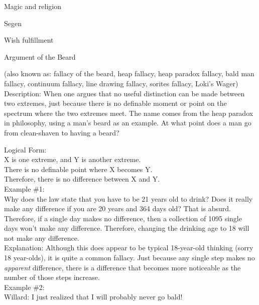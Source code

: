 \documentclass[a4paper,12pt,single,pdftex]{scrartcl}
\begin{document}
Magic and religion

Segen

Wish fulfillment

Argument of the Beard
    
      (also known as: fallacy of the beard, heap fallacy, heap paradox fallacy, bald man fallacy, continuum fallacy, line drawing fallacy, sorites fallacy, Loki's Wager)
    \\

  
    Description: When one argues that no useful distinction can be made between two extremes, just because there is no definable moment or point on the spectrum where the two extremes meet.  The name comes from the heap paradox in philosophy, using a man’s beard as an example.  At what point does a man go from clean-shaven to having a beard?

    
      Logical Form:
    \\

    
      X is one extreme, and Y is another extreme.
    \\

    
      There is no definable point where X becomes Y.
    \\

    
      Therefore, there is no difference between X and Y.
    \\

    
      Example \#1:
    \\

    
      Why does the law state that you have to be 21 years old to drink?  Does it really make any difference if you are 20 years and 364 days old?  That is absurd.  Therefore, if a single day makes no difference, then a collection of 1095 single days won’t make any difference. Therefore, changing the drinking age to 18 will not make any difference.
    \\

    
      Explanation: Although this does appear to be typical 18-year-old thinking (sorry 18 year-olds), it is quite a common fallacy.  Just because any single step makes no {\it apparent} difference, there is a difference that becomes more noticeable as the number of those steps increase.
    \\

    
      Example \#2:
    \\

    
      Willard: I just realized that I will probably never go bald!
    \\
\end{document}
